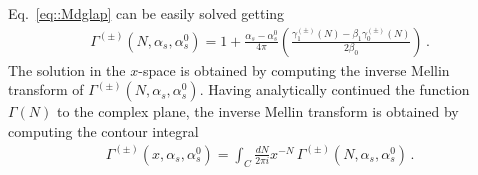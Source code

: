 Eq.~\eqref{eq::Mdglap} can be easily solved getting
\begin{align}
    \Gamma^{(\pm)}\left(N,\alpha_s,\alpha_s^0\right) = 
    1 + \frac{\alpha_s -\alpha_s^0}{4\pi}
    \left(\frac{\gamma^{(\pm)}_1 \left(N\right)-\beta_1 \gamma^{(\pm)}_0\left(N\right)}{2\beta_0} \right)
    \,.
\end{align}
%
The solution in the $x$-space is obtained by computing the inverse Mellin
transform of $\Gamma^{(\pm)}\left(N,\alpha_s,\alpha_s^0\right)$. Having
analytically continued the function $\Gamma\left(N\right)$ to the complex plane,
the inverse Mellin transform is obtained by computing the contour integral
\begin{align}
    \Gamma^{(\pm)}\left(x,\alpha_s,\alpha_s^0\right) = 
    \int_C \frac{dN}{2\pi i}x^{-N}\, 
    \Gamma^{(\pm)}\left(N,\alpha_s,\alpha_s^0\right)\, .
\end{align}


